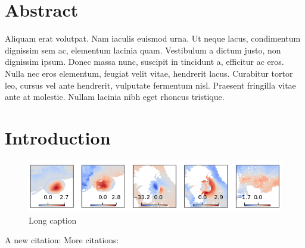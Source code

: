 \begin{refsection}
\section*{Abstract}
Aliquam erat volutpat. Nam iaculis euismod urna. Ut neque lacus, condimentum dignissim sem ac, elementum lacinia quam. Vestibulum a dictum justo, non dignissim ipsum. Donec massa nunc, suscipit in tincidunt a, efficitur ac eros. Nulla nec eros elementum, feugiat velit vitae, hendrerit lacus. Curabitur tortor leo, cursus vel ante hendrerit, vulputate fermentum nisl. Praesent fringilla vitae ante at molestie. Nullam lacinia nibh eget rhoncus tristique.



\section{Introduction} %
\label{sec:intro}

\begin{figure}[tbp]
	\centering
	\includegraphics[width=1\textwidth]{./publication2_figures/figure_14_signals.png}
	\caption[Short Caption]{Long caption}
	\label{fig:label2}
\end{figure}



A new citation: \citep{Bernard1997}
More citations: \citep{Hyvarinen1997}



\printbibliography[heading=subbibliography]
\end{refsection}
